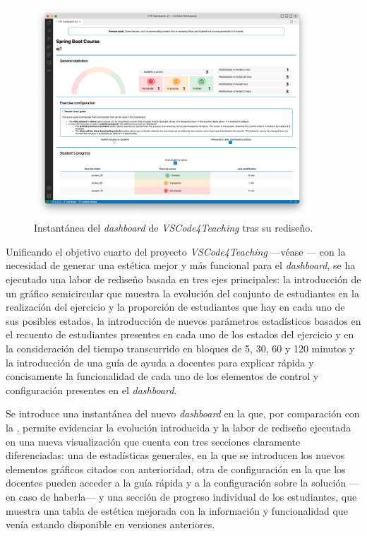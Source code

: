 \begin{figure}[ht]
    \centering
    \includegraphics[width=0.925\textwidth]{imagenes/utilizadas/4-3-implementacion/rf12-2.png}
    \caption{Instantánea del \textit{dashboard} de \textit{VSCode4Teaching} tras su rediseño.}
    \label{fig:reqf12-2}
\end{figure}

Unificando el objetivo cuarto del proyecto \textit{VSCode4Teaching} ---véase --- con la necesidad de generar una estética mejor y más funcional para el \textit{dashboard}, se ha ejecutado una labor de rediseño basada en tres ejes principales: la introducción de un gráfico semicircular que muestra la evolución del conjunto de estudiantes en la realización del ejercicio y la proporción de estudiantes que hay en cada uno de sus posibles estados, la introducción de nuevos parámetros estadísticos basados en el recuento de estudiantes presentes en cada uno de los estados del ejercicio y en la consideración del tiempo transcurrido en bloques de 5, 30, 60 y 120 minutos y la introducción de una guía de ayuda a docentes para explicar rápida y concisamente la funcionalidad de cada uno de los elementos de control y configuración presentes en el \textit{dashboard}.

Se introduce una instantánea del nuevo \textit{dashboard} en la  que, por comparación con la , permite evidenciar la evolución introducida y la labor de rediseño ejecutada en una nueva visualización que cuenta con tres secciones claramente diferenciadas: una de estadísticas generales, en la que se introducen los nuevos elementos gráficos citados con anterioridad, otra de configuración en la que los docentes pueden acceder a la guía rápida y a la configuración sobre la solución ---en caso de haberla--- y una sección de progreso individual de los estudiantes, que muestra una tabla de estética mejorada con la información y funcionalidad que venía estando disponible en versiones anteriores.

